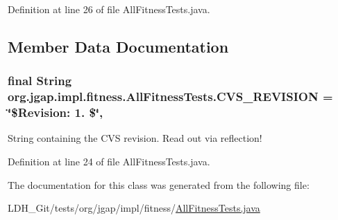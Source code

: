 Definition at line 26 of file All\-Fitness\-Tests.\-java.



\subsection{Member Data Documentation}
\hypertarget{classorg_1_1jgap_1_1impl_1_1fitness_1_1_all_fitness_tests_a2b1dbc552b7e45644811af385df839ec}{
\subsubsection[{C\-V\-S\-\_\-\-R\-E\-V\-I\-S\-I\-O\-N}]{\setlength{\rightskip}{0pt plus 5cm}final String org.\-jgap.\-impl.\-fitness.\-All\-Fitness\-Tests.\-C\-V\-S\-\_\-\-R\-E\-V\-I\-S\-I\-O\-N = \char`\"{}\$Revision\-: 1. \$\char`\"{}\hspace{0.3cm}{\ttfamily [static]}, {\ttfamily [private]}}}\label{classorg_1_1jgap_1_1impl_1_1fitness_1_1_all_fitness_tests_a2b1dbc552b7e45644811af385df839ec}
String containing the C\-V\-S revision. Read out via reflection! 

Definition at line 24 of file All\-Fitness\-Tests.\-java.



The documentation for this class was generated from the following file\-:\begin{DoxyCompactItemize}
\item 
L\-D\-H\-\_\-\-Git/tests/org/jgap/impl/fitness/\hyperlink{_all_fitness_tests_8java}{All\-Fitness\-Tests.\-java}\end{DoxyCompactItemize}
